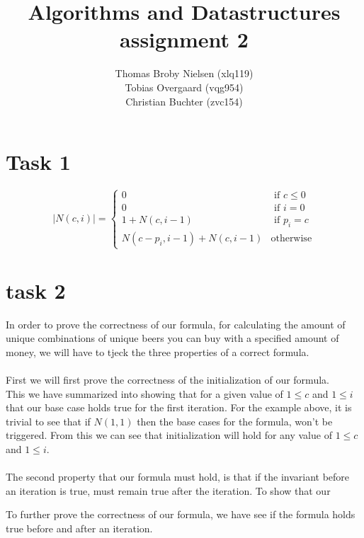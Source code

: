 \documentclass[12pt]{article}
\title{Algorithms and Datastructures assignment 2}
\author{Thomas Broby Nielsen (xlq119)\\ Tobias Overgaard (vqg954)\\ Christian Buchter (zvc154)}
\begin{document}
\maketitle

\tableofcontents

\pagebreak
\section{Task 1}
$$
|N(c,i)| = \left\{ \begin{array}{rl}
0 &\mbox{ if $c \leq 0$} \\
0 &\mbox{ if $i=0$} \\
1+N(c,i-1) &\mbox{ if $p_i=c$}\\
N(c-p_i,i-1)+N(c,i-1) &\mbox{otherwise}
\end{array} \right.
$$

\section{task 2}
In order to prove the correctness of our formula, for calculating the amount of unique combinations of unique beers you can buy with a specified amount of money, we will have to tjeck the three properties of a correct formula.
 \\ \\
First we will first prove the correctness of the initialization of our formula.
\\
This we have summarized into showing that for a given value of $1 \leq c$ and $1 \leq i$ that our base case holds true for the first iteration.
For the example above, it is trivial to see that if $N(1,1)$ then the base cases for the formula, won't be triggered. From this we can see that initialization will hold for any value of $1 \leq c$ and $1 \leq i$.
\\  \\
The second property that our formula must hold, is that if the invariant before an iteration is true, must remain true after the iteration. To show that our 

To further prove the correctness of our formula, we have see if the formula holds true before and after an iteration. 

\newpage
\end{document}
